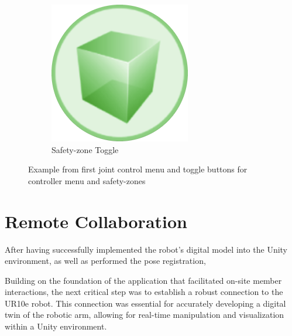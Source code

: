 \begin{figure}[h]
\begin{subfigure}[b]{0.31\textwidth}
                \centering
                \includegraphics[width=0.3\linewidth]{figs/unclick_sz.png}
                \caption{Safety-zone Toggle}
                \label{fig:toggle-safety}
            \end{subfigure}
            \caption{Example from first joint control menu and toggle buttons for controller menu and safety-zones}
            \label{fig:joint-toggle}
            \end{figure}
        
            

\section{Remote Collaboration}

    After having successfully implemented the robot's digital model into the Unity environment, as well as performed the pose registration, 



    Building on the foundation of the application that facilitated on-site member interactions, the next critical step was to establish a robust connection to the UR10e robot. This connection was essential for accurately developing a digital twin of the robotic arm, allowing for real-time manipulation and visualization within a Unity environment.

